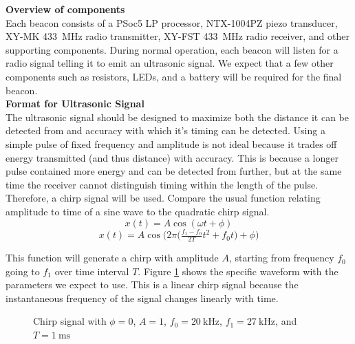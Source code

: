 \documentclass{article}
\begin{document}
      \textbf{Overview of components} \\
      Each beacon consists of a PSoc5 LP processor, NTX-1004PZ piezo transducer, XY-MK \SI{433}{\mega\hertz} radio transmitter, XY-FST \SI{433}{\mega\hertz} radio receiver, and other supporting components. During normal operation, each beacon will listen for a radio signal telling it to emit an ultrasonic signal. We expect that a few other components such as resistors, LEDs, and a battery will be required for the final beacon. \\

      \textbf{Format for Ultrasonic Signal} \\
      The ultrasonic signal should be designed to maximize both the distance it can be detected from and accuracy with which it's timing can be detected. Using a simple pulse of fixed frequency and amplitude is not ideal because it trades off energy transmitted (and thus distance) with accuracy. This is because a longer pulse contained more energy and can be detected from further, but at the same time the receiver cannot distinguish timing within the length of the pulse. Therefore, a chirp signal will be used. Compare the usual function relating amplitude to time of a sine wave to the quadratic chirp signal.
      $$ x(t) = A\cos(\omega t + \phi) $$
      $$ x(t) = A\cos\bigg(2\pi\Big(\tfrac{f_1 - f_0}{2T}t^2+f_0t\Big) + \phi\bigg) $$

      This function will generate a chirp with amplitude $A$, starting from frequency $f_0$ going to $f_1$ over time interval $T$. Figure \ref{fig:chirp} shows the specific waveform with the parameters we expect to use. This is a linear chirp signal because the instantaneous frequency of the signal changes linearly with time.

      \begin{figure}[H]
        \centering
        \label{fig:chirp}
        \caption{Chirp signal with $\phi=0$, $A=1$, $f_0=\SI{20}{\kilo\hertz}$, $f_1=\SI{27}{\kilo\hertz}$, and $T=\SI{1}{\milli\second}$}
      \end{figure}
\end{document}
